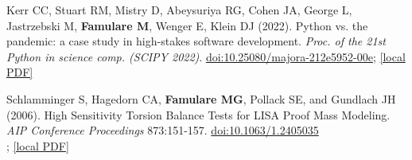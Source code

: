 \documentclass{article}
\begin{document}
\begin{llist}
 \vspace{4pt}
 \begin{items}
  \item[{[2]}] Kerr CC, Stuart RM, Mistry D, Abeysuriya RG, Cohen JA, George L, Jastrzebski M, \textbf{Famulare M}, Wenger E, Klein DJ (2022). Python vs. the pandemic: a case study in high-stakes software development. \emph{Proc. of the 21st Python in science comp. (SCIPY 2022)}. \href{https://doi.org/10.25080/majora-212e5952-00e}{doi:10.25080/majora-212e5952-00e}; \href{https://famulare.github.io/assets/publication-mirror/proceedings-02.pdf}{[local PDF]}
 	
  \item[{[1]}] Schlamminger S, Hagedorn CA, \textbf{Famulare MG}, Pollack SE, and Gundlach JH (2006). High Sensitivity Torsion Balance Tests for LISA Proof Mass Modeling. \emph{AIP Conference Proceedings} 873:151-157.  \href{https://doi.org/10.1063/1.2405035}{doi:10.1063/1.2405035} \\; \href{https://famulare.github.io/assets/publication-mirror/proceedings-01.pdf}{[local PDF]}

\end{items}

\vspace{4pt}


\end{llist}
\end{document}
